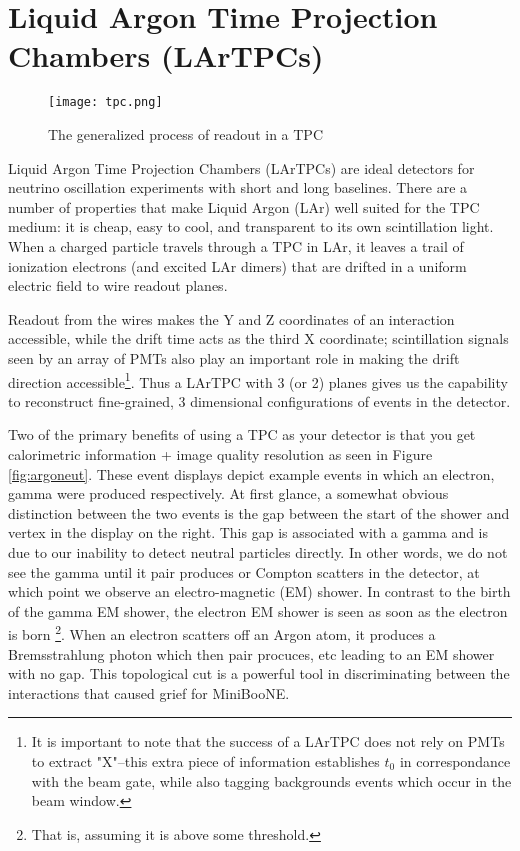 \documentclass[12pt]{article}
\begin{document}
\section{Liquid Argon Time Projection Chambers (LArTPCs)}
\begin{figure}[h!]
\centering
\texttt{[image: tpc.png]}
\caption{The generalized process of readout in a TPC}
\end{figure}
\par Liquid Argon Time Projection Chambers (LArTPCs) are ideal detectors for neutrino oscillation experiments with short and long baselines.  There are a number of properties that make Liquid Argon (LAr) well suited for the TPC medium: it is cheap, easy to cool, and transparent to its own scintillation light.  When a charged particle travels through a TPC in LAr, it leaves a trail of ionization electrons (and excited LAr dimers) that are drifted in a uniform electric field to wire readout planes. 

Readout from the wires makes the Y and Z coordinates of an interaction accessible, while the drift time acts as the third X coordinate; scintillation signals seen by an array of PMTs also play an important role in making the drift direction accessible\footnote{It is important to note that the success of a LArTPC does not rely on PMTs to extract "X"--this extra piece of information establishes $t_0$ in correspondance with the beam gate, while also tagging backgrounds events which occur in the beam window.}.  Thus a LArTPC with 3 (or 2) planes gives us the capability to reconstruct fine-grained, 3 dimensional configurations of events in the detector. \vspace{4 mm}
\par Two of the primary benefits of using a TPC as your detector is that you get calorimetric information + image quality resolution as seen in Figure \ref{fig:argoneut}.  These event displays depict example events in which an electron, gamma were produced respectively. At first glance, a somewhat obvious distinction between the two events is the gap between the start of the shower and vertex in the display on the right.  This gap is associated with a gamma and is due to our inability to detect neutral particles directly. In other words, we do not see the gamma until it pair produces or Compton scatters in the detector, at which point we observe an electro-magnetic (EM) shower. In contrast to the birth of the gamma EM shower, the electron EM shower is seen as soon as the electron is born \footnote{That is, assuming it is above some threshold.}.  When an electron scatters off an Argon atom, it produces a Bremsstrahlung photon which then pair procuces, etc leading to an EM shower with no gap. This topological cut is a powerful tool in discriminating between the interactions that caused grief for MiniBooNE. 
\end{document}
